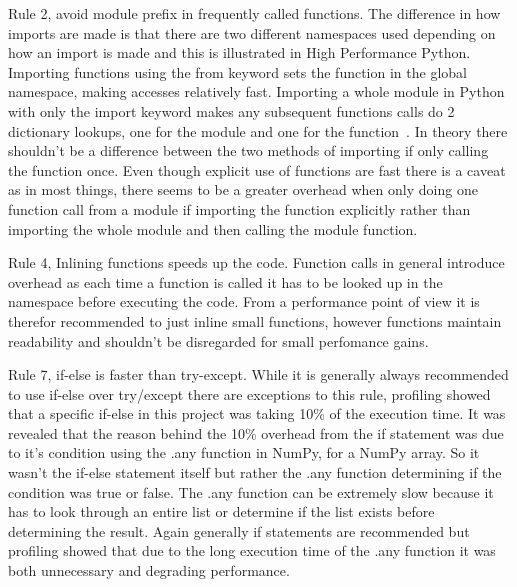 \documentclass[12pt, a4paper]{article}
\begin{document}
Rule 2, avoid module prefix in frequently called functions.
The difference in how imports are made is that there are two different namespaces used depending on how an import is made and this is illustrated in High Performance Python.
Importing functions using the from keyword sets the function in the global namespace, making accesses relatively fast.
Importing a whole module in Python with only the import keyword makes any subsequent functions calls do 2 dictionary lookups, one for the module and one for the function~\cite{oreillyCh4}.
In theory there shouldn't be a difference between the two methods of importing if only calling the function once.
Even though explicit use of functions are fast there is a caveat as in most things, there seems to be a greater overhead when only doing one function call from a module if importing the function explicitly rather than importing the whole module and then calling the module function.


Rule 4, Inlining functions speeds up the code.
Function calls in general introduce overhead as each time a function is called it has to be looked up in the namespace before executing the code.
From a performance point of view it is therefor recommended to just inline small functions, however functions maintain readability and shouldn't be disregarded for small perfomance gains. 



Rule 7, if-else is faster than try-except.
While it is generally always recommended to use if-else over try/except there are exceptions to this rule, profiling showed that a specific if-else in this project was taking 10\% of the execution time.
It was revealed that the reason behind the 10\% overhead from the if statement was due to it's condition using the .any function in NumPy, for a NumPy array.
So it wasn't the if-else statement itself but rather the .any function determining if the condition was true or false.
The .any function can be extremely slow because it has to look through an entire list or determine if the list exists before determining the result.
Again generally if statements are recommended but profiling showed that due to the long execution time of the .any function it was both unnecessary and degrading performance.

\end{document}

